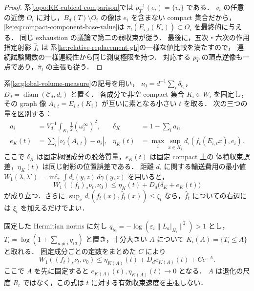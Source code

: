\begin{proof}
系\ref{topo:KE-cubical-comparison}では $p_T^{-1}(e_i)=\{v_i\}$ である．
$v_i$ の任意の近傍 $O_i$ に対し，$B_d(T)\setminus O_i$ の像は
$e_i$ を含まない compact 集合だから，
\eqref{ke:eq:compact-component-base-value}は
$\pi_t(E_{i,t}(K_i))\subset O_i$ を最終的に与える．
同じ exhaustion の議論で第二の弱収束が従う．
最後に，五次・六次の作用指定射影 $\widehat f_t$ は
系\ref{ke:relative-replacement-gh}の一様な値比較を満たすので，
連続試験関数の一様連続性から同じ測度極限を持つ．
対応する $p_{\widehat T}$ の頂点逆像も一点であり，$\widehat\pi_t$ の主張も従う．
\end{proof}

\begin{proposition}
\label{ke:fixed-cutoff-volume-transport}
系\ref{ke:global-volume-measure}の記号を用い，
$\nu_0=d^{-1}\sum_i\delta_{e_i}$，
$D_d=\operatorname{diam}(\mathcal C_d,d_\square)$ と置く．
各成分で非空 compact 集合 $K_i\Subset W_i$ を固定し，
その graph 像 $A_{i,t}=E_{i,t}(K_i)$ が互いに素となる小さい $t$ を取る．
次の三つの量を区別する：
\begin{align*}
 a_i&=V_d^{-1}\int_{K_i}\tfrac12(\omega_i^\infty)^2,
 &\delta_K&=1-\sum_i a_i,\\
 e_K(t)&=\sum_i\left|\nu_t(A_{i,t})-a_i\right|,
 &\eta_K(t)&=\max_i\sup_{x\in K_i}
 d_\square(f_t(E_{i,t}x),e_i).
\end{align*}
ここで $\delta_K$ は固定極限成分の脱落質量，$e_K(t)$ は固定 compact 上の
体積収束誤差，$\eta_K(t)$ は同じ射影の位置誤差である．
距離 $d_\square$ に関する輸送費用の最小値
$W_1(\lambda,\lambda')=\inf_{\gamma}\int d_\square(y,z)\,d\gamma(y,z)$
を用いると，
\begin{equation}\label{ke:eq:fixed-cutoff-volume-transport}
 W_1((f_t)_*\nu_t,\nu_0)
 \le \eta_K(t)+D_d\bigl(\delta_K+e_K(t)\bigr)
\end{equation}
が成り立つ．さらに $\sup_xd_\square(f_t(x),\widehat f_t(x))\le\xi_t$
なら，$\widehat f_t$ についての右辺には $\xi_t$ を加えるだけでよい．

固定した Hermitian norms に対し
$q_{ia}=-\log(\varepsilon_i\|L_a|_{H_i}\|^2)>1$ とし，
$T_i=\log(1+\sum_{a\ne i}q_{ia})$ と置き，十分大きい $A$ について
$K_i(A)=\{T_i\le A\}$ と取れる．
固定成分ごとの定数をまとめた $C$ により
\begin{equation}\label{ke:eq:fixed-cutoff-measure-budget}
 W_1((f_t)_*\nu_t,\nu_0)
 \le\eta_{K(A)}(t)+D_d e_{K(A)}(t)+Ce^{-A}.
\end{equation}
ここで $A$ を先に固定すると $e_{K(A)}(t),\eta_{K(A)}(t)\to0$ となる．
$A$ は退化の尺度 $R_t$ ではなく，この式は $t$ に対する有効収束速度を主張しない．
\end{proposition}

